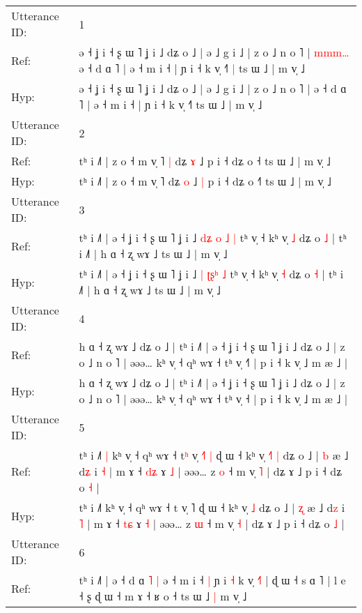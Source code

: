 \documentclass[10pt]{article}
\DeclareRobustCommand{\hl}[1]{{\textcolor{red}{#1}}}
\begin{document}
\begin{longtable}{ll}
\toprule
Utterance ID: & 1 \\
Ref: & ə ˧ ʝ i ˧ ʂ ɯ ˥ ʝ i ˩ dʑ o ˩ | ə ˩ g i ˩ | z o ˩ n o ˥ |\hl{ }\hl{m}\hl{m}\hl{m}\hl{…} ə ˧ d ɑ ˥ | ə ˧ m i ˧ | ɲ i ˧ k v̩ ˧˥\hl{ }\hl{|} ts ɯ ˩ | m v̩ ˩
 \\
Hyp: & ə ˧ ʝ i ˧ ʂ ɯ ˥ ʝ i ˩ dʑ o ˩ | ə ˩ g i ˩ | z o ˩ n o ˥ |\hl{}\hl{}\hl{}\hl{}\hl{} ə ˧ d ɑ ˥ | ə ˧ m i ˧ | ɲ i ˧ k v̩ ˧˥\hl{}\hl{} ts ɯ ˩ | m v̩ ˩
 \\
\midrule
Utterance ID: & 2 \\
Ref: & tʰ i ˩˥ | z o ˧ m v̩ ˥\hl{ }\hl{|} dʑ \hl{ɤ} ˩\hl{}\hl{} p i ˧ dʑ o ˧\hl{} ts ɯ ˩ | m v̩ ˩
 \\
Hyp: & tʰ i ˩˥ | z o ˧ m v̩ ˥\hl{}\hl{} dʑ \hl{o} ˩\hl{ }\hl{|} p i ˧ dʑ o ˧\hl{˥} ts ɯ ˩ | m v̩ ˩
 \\
\midrule
Utterance ID: & 3 \\
Ref: & tʰ i ˩˥ | ə ˧ ʝ i ˧ ʂ ɯ ˥ ʝ i ˩ \hl{d}\hl{ʑ} \hl{o}\hl{ }\hl{˩} \hl{|} tʰ v̩ ˧ kʰ v̩ \hl{˩} dʑ o \hl{˩} | tʰ i ˩˥ | h ɑ ˧ ʐ wɤ ˩ ts ɯ ˩ | m v̩ ˩
 \\
Hyp: & tʰ i ˩˥ | ə ˧ ʝ i ˧ ʂ ɯ ˥ ʝ i ˩ \hl{}\hl{|} \hl{ʈ}\hl{ʂ}\hl{ʰ} \hl{˩} tʰ v̩ ˧ kʰ v̩ \hl{˧} dʑ o \hl{˧} | tʰ i ˩˥ | h ɑ ˧ ʐ wɤ ˩ ts ɯ ˩ | m v̩ ˩
 \\
\midrule
Utterance ID: & 4 \\
Ref: & h ɑ ˧ ʐ wɤ ˩ dʑ o ˩ | tʰ i ˩˥ | ə ˧ ʝ i ˧ ʂ ɯ ˥ ʝ i ˩ dʑ o ˩ | z o ˩ n o ˥ | əəə… kʰ v̩ ˧ qʰ wɤ ˧ tʰ v̩ ˧\hl{˥} | p i ˧ k v̩ ˩ m æ ˩ |
 \\
Hyp: & h ɑ ˧ ʐ wɤ ˩ dʑ o ˩ | tʰ i ˩˥ | ə ˧ ʝ i ˧ ʂ ɯ ˥ ʝ i ˩ dʑ o ˩ | z o ˩ n o ˥ | əəə… kʰ v̩ ˧ qʰ wɤ ˧ tʰ v̩ ˧\hl{} | p i ˧ k v̩ ˩ m æ ˩ |
 \\
\midrule
Utterance ID: & 5 \\
Ref: & tʰ i ˩˥\hl{ }\hl{|} kʰ v̩ ˧ qʰ wɤ ˧ t\hl{ʰ} v̩ \hl{˧}˥\hl{ }\hl{|} ɖ ɯ ˧ kʰ v̩\hl{ }\hl{˧}\hl{˥} \hl{|} dʑ o ˩ | \hl{b} æ ˩ d\hl{ʑ} i \hl{˧} | m ɤ ˧ \hl{d}\hl{ʑ} ɤ \hl{˩} | əəə… z \hl{o} ˧ m v̩ \hl{˥} | dʑ ɤ ˩ p i ˧ dʑ o \hl{˧} |
 \\
Hyp: & tʰ i ˩˥\hl{}\hl{} kʰ v̩ ˧ qʰ wɤ ˧ t\hl{} v̩ \hl{}˥\hl{}\hl{} ɖ ɯ ˧ kʰ v̩\hl{}\hl{}\hl{} \hl{˩} dʑ o ˩ | \hl{ʐ} æ ˩ d\hl{z} i \hl{˥} | m ɤ ˧ \hl{t}\hl{ɕ} ɤ \hl{˧} | əəə… z \hl{ɯ} ˧ m v̩ \hl{˧} | dʑ ɤ ˩ p i ˧ dʑ o \hl{˩} |
 \\
\midrule
Utterance ID: & 6 \\
Ref: & tʰ i ˩˥ | ə ˧ d ɑ\hl{ }\hl{˥} \hl{|} ə ˧ m i ˧\hl{ }\hl{|} ɲ i \hl{˧} k v̩ \hl{˧}\hl{˥} | ɖ ɯ ˧ s ɑ ˥ | l e ˧ ʂ\hl{}\hl{}\hl{}\hl{}\hl{}\hl{}\hl{}\hl{}\hl{} ɖ ɯ ˧ m ɤ ˧ ʁ o ˧ ts ɯ ˩\hl{ }\hl{|} m v̩ ˩

\end{longtable}
\end{document}
